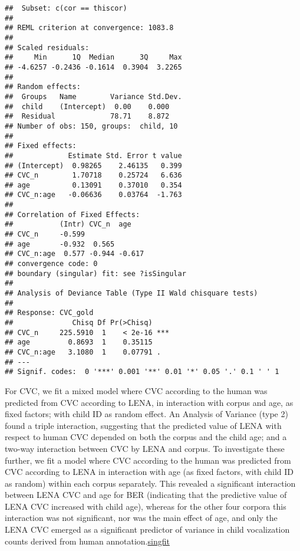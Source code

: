 \documentclass[english,floatsintext,man]{apa6}
\begin{document}
\begin{verbatim}
##  Subset: c(cor == thiscor)
## 
## REML criterion at convergence: 1083.8
## 
## Scaled residuals: 
##     Min      1Q  Median      3Q     Max 
## -4.6257 -0.2436 -0.1614  0.3904  3.2265 
## 
## Random effects:
##  Groups   Name        Variance Std.Dev.
##  child    (Intercept)  0.00    0.000   
##  Residual             78.71    8.872   
## Number of obs: 150, groups:  child, 10
## 
## Fixed effects:
##             Estimate Std. Error t value
## (Intercept)  0.98265    2.46135   0.399
## CVC_n        1.70718    0.25724   6.636
## age          0.13091    0.37010   0.354
## CVC_n:age   -0.06636    0.03764  -1.763
## 
## Correlation of Fixed Effects:
##           (Intr) CVC_n  age   
## CVC_n     -0.599              
## age       -0.932  0.565       
## CVC_n:age  0.577 -0.944 -0.617
## convergence code: 0
## boundary (singular) fit: see ?isSingular
## 
## Analysis of Deviance Table (Type II Wald chisquare tests)
## 
## Response: CVC_gold
##              Chisq Df Pr(>Chisq)    
## CVC_n     225.5910  1    < 2e-16 ***
## age         0.8693  1    0.35115    
## CVC_n:age   3.1080  1    0.07791 .  
## ---
## Signif. codes:  0 '***' 0.001 '**' 0.01 '*' 0.05 '.' 0.1 ' ' 1
\end{verbatim}

For CVC, we fit a mixed model where CVC according to the human was
predicted from CVC according to LENA, in interaction with corpus and
age, as fixed factors; with child ID as random effect. An Analysis of
Variance (type 2) found a triple interaction, suggesting that the
predicted value of LENA with respect to human CVC depended on both the
corpus and the child age; and a two-way interaction between CVC by LENA
and corpus. To investigate these further, we fit a model where CVC
according to the human was predicted from CVC according to LENA in
interaction with age (as fixed factors, with child ID as random) within
each corpus separately. This revealed a significant interaction between
LENA CVC and age for BER (indicating that the predictive value of LENA
CVC increased with child age), whereas for the other four corpora this
interaction was not significant, nor was the main effect of age, and
only the LENA CVC emerged as a significant predictor of variance in
child vocalization counts derived from human
annotation.\href{For\%20both\%20BER\%20and\%20WAR,\%20the\%20variance\%20associated\%20to\%20the\%20child\%20ID\%20random\%20factor\%20was\%20zero.\%20This\%20suggests\%20a\%20mixed\%20model\%20was\%20not\%20necessary,\%20as\%20child\%20ID\%20is\%20not\%20explaining\%20any\%20additional\%20variance,\%20but\%20it\%20does\%20not\%20alter\%20the\%20interpretation\%20in\%20the\%20main\%20text.}{singfit}
\end{document}
